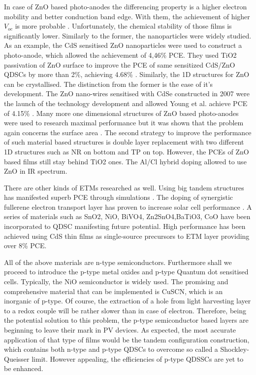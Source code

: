 \begin{enumerate}
In case of ZnO based photo-anodes the differencing property is a higher electron mobility and better conduction band edge. With them, the achievement of higher $V_{oc}$  is more probable \cite{X.Gao2017} . Unfortunately, the chemical stability of those films is significantly lower. Similarly to the former, the nanoparticles were widely studied. \cite{L.Lv2014a} As an example, the CdS sensitised ZnO nanoparticles were used to construct a photo-anode, which allowed the achievement of 4,46\% PCE. They used TiO2 passivation of ZnO surface to improve the PCE of same sensitized CdS/ZnO QDSCs by more than 2\%, achieving 4.68\% \cite{Zhang2013b}. Similarly, the 1D structures for ZnO can be crystallised. The distinction from the former is the ease of it's development. The ZnO nano-wires sensitised with CdSe constructed in 2007 were the launch of the technology development and allowed Young et al. achieve PCE of 4.15\% \cite{J.Qiu2013}. Many more one dimensional structures of ZnO based photo-anodes were used to research maximal performance but it was shown that the problem again concerns the surface area \cite{Gonzalez-Pedro2015}. The second strategy to improve the performance of such material based structures is double layer replacement with two different 1D structures such as NR on bottom and TP on top.  However, the PCEs of ZnO based films still stay behind TiO2 ones.\cite{Zhang2013b}  The Al/Cl hybrid doping allowed to use ZnO in IR spectrum.

There are other kinds of ETMs researched as well.  Using big tandem structures has manifested superb PCE through simulations \cite{GregoryF.Pach2017}. The doping of synergistic fullerene electron transport layer has proven to increase solar cell performance \cite{OleksandrVoznyy2014} . A series of materials such as SnO2, NiO, BiVO4, Zn2SnO4,BaTiO3, CoO have been incorporated to QDSC manifesting future potential. High performance has been achieved using CdS thin films as single-source precursors to ETM layer providing over 8\% PCE. \cite{RobertJ.Patterson2017}

All of the above materials are n-type semiconductors. Furthermore shall we proceed to introduce the p-type metal oxides and p-type Quantum dot sensitised cells. Typically, the NiO semiconductor is widely used. The promising and comprehensive material that can be implemented is CuSCN, which is an inorganic of p-type. Of course, the extraction of a hole from light harvesting layer to a redox couple will be rather slower than in case of electron. Therefore, being the potential solution to this problem, the p-type semiconductor based layers are beginning to leave their mark in PV devices. As expected, the most accurate application of that type of films would be the tandem configuration construction, which contains both n-type and p-type QDSCs to overcome so called  a Shockley-Queisser limit. However appealing, the efficiencies of p-type QDSSCs are yet to be enhanced.



\end{enumerate}
